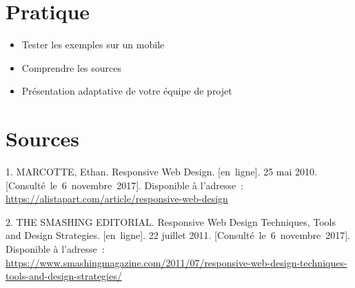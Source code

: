 \hypertarget{pratique}{%
\section{Pratique}\label{pratique}}

\begin{itemize}
\tightlist
\item
  Tester les exemples sur un mobile
\item
  Comprendre les sources
\item
  Présentation adaptative de votre équipe de projet
\end{itemize}

\hypertarget{sources}{%
\section*{Sources}\label{sources}}

\hypertarget{refs}{}
\begin{cslreferences}
\leavevmode\hypertarget{ref-alistapart:rwd}{}%
1. MARCOTTE, Ethan. Responsive Web Design. {[}en~ligne{]}. 25 mai 2010.
{[}Consulté~le~6~novembre~2017{]}. Disponible à l'adresse~:
\url{https://alistapart.com/article/responsive-web-design}

\leavevmode\hypertarget{ref-smashing:rwd}{}%
2. THE SMASHING EDITORIAL. Responsive Web Design Techniques, Tools and
Design Strategies. {[}en~ligne{]}. 22 juillet 2011.
{[}Consulté~le~6~novembre~2017{]}. Disponible à l'adresse~:
\url{https://www.smashingmagazine.com/2011/07/responsive-web-design-techniques-tools-and-design-strategies/}
\end{cslreferences}
